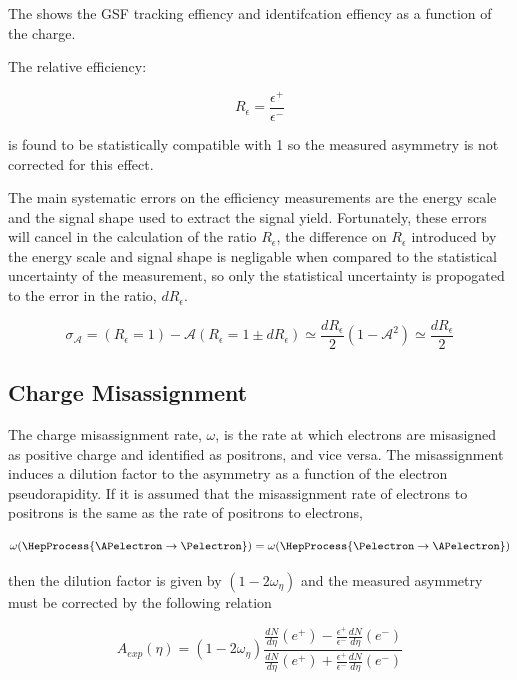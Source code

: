 The  shows the GSF tracking effiency and identifcation 
effiency as a function of the charge.

The relative efficiency: 

\begin{equation}
R_\epsilon  =  \frac{\epsilon^+}{\epsilon^-}
\end{equation}

is found to be statistically compatible with 1 so the measured asymmetry is not
corrected for this effect.

The main systematic errors on the efficiency measurements are the energy scale
and the signal shape used to extract the signal yield. Fortunately, these
errors will cancel in the calculation of the ratio $R_\epsilon$, the difference
on  $R_\epsilon$ introduced by the energy scale and signal shape is negligable
when compared to the statistical uncertainty of the measurement, so only the
statistical uncertainty is propogated to the error in the ratio,
$dR_\epsilon$.

\begin{equation}
  \label{eq:releff}
  \sigma_{\mathcal{A}} =\mathcal{}(R_\epsilon=1) - \mathcal{A}(R_\epsilon=1\pm dR_\epsilon)  \simeq \frac{dR_\epsilon}{2}(1-\mathcal{A}^2)\simeq \frac{dR_\epsilon}{2}
\end{equation}

\subsection{Charge Misassignment}

The charge misassignment rate, $\omega$, is the rate at which electrons are
misasigned as positive charge and identified as positrons, and vice versa. The
misassignment induces a dilution factor to the asymmetry as a function of the
electron pseudorapidity. If it is assumed that the misassignment rate of
electrons to positrons is the same as the rate of positrons to electrons, \ie 

\begin{equation}
  \omega( \HepProcess{\APelectron \to \Pelectron} ) =
  \omega( \HepProcess{\Pelectron \to \APelectron} )
\end{equation}

then the dilution factor is given by $(1-2\omega_\eta)$ and the measured
asymmetry must be corrected by the following relation

\begin{equation}
  A_{exp}(\eta) = (1-2\omega_\eta)
                \frac{
                    \frac{dN}{d\eta}(e^+)-
                    \frac{\epsilon^+}{\epsilon^-}\frac{dN}{d\eta}(e^-)
                }
                {
                    \frac{dN}{d\eta}(e^+)+
                    \frac{\epsilon^+}{\epsilon^-}\frac{dN}{d\eta}(e^-)
                }
\end{equation}

